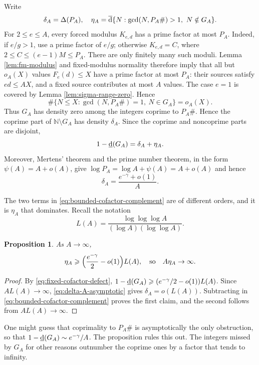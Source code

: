 \documentclass[11pt,letterpaper,reqno]{amsart}
\numberwithin{equation}{section}
\newtheorem{proposition}[theorem]{Proposition}
\theoremstyle{remark}
\newcommand{\N}{\mathbb{N}}
\newcommand{\1}{\mathbf 1}
\newcommand{\lowerdens}{\underline{\textup{d}}}
\newcommand{\upperdens}{\overline{\textup{d}}}
\renewcommand{\leq}{\leqslant}
\renewcommand{\geq}{\geqslant}
\begin{document}
Write
\[
 \delta_A=\Delta(P_A),\quad
 \eta_A=\upperdens\{N:\gcd(N,P_A\#)>1,\ N\notin G_A\}.
\]
For $2\leq e\leq A$, every forced modulus $K_{e,d}$ has a prime
factor at most $P_A$. Indeed, if $e/g>1$, use a prime factor of $e/g$;
otherwise $K_{e,d}=C$, where $2\leq C\leq(e-1)M\leq P_A$.
There are only finitely many such moduli. Lemma \ref{lem:fm-modulus}
and fixed-modulus normality therefore imply that all but $o_A(X)$
values $F_e(d)\leq X$ have a prime factor at most $P_A$: their sources
satisfy $ed\leq AX$, and a fixed source contributes at most $A$ values.
The case $e=1$ is covered by Lemma \ref{lem:sigma-range-zero}. Hence
\[
 \#\{N\leq X:\gcd(N,P_A\#)=1,\ N\in G_A\}=o_A(X).
\]
Thus $G_A$ has density zero among the integers coprime to
$P_A\#$. Hence the coprime part of $\N\setminus G_A$ has density
$\delta_A$. Since the coprime and noncoprime parts are disjoint,
\begin{equation}\label{eq:bounded-cofactor-complement}
 1-\lowerdens(G_A)=\delta_A+\eta_A.
\end{equation}
Moreover, Mertens' theorem and the prime number theorem, in the form
$\psi(A)=A+o(A)$, give
$\log P_A=\log A+\psi(A)=A+o(A)$ and hence
\begin{equation}\label{eq:delta-A-asymptotic}
 \delta_A=\frac{e^{-\gamma}+o(1)}A.
\end{equation}

The two terms in \eqref{eq:bounded-cofactor-complement} are of different
orders, and it is $\eta_A$ that dominates. Recall the notation
\[
 L(A)=\frac{\log\log\log A}{(\log A)(\log\log A)} .
\]

\begin{proposition}
As $A\to\infty$,
\[
 \eta_A\geq\Bigl(\frac{e^{-\gamma}}2-o(1)\Bigr)L(A),
 \quad\text{so}\quad A\eta_A\to\infty .
\]
\end{proposition}

\begin{proof}
By \eqref{eq:fixed-cofactor-defect},
$1-\lowerdens(G_A)\geq(e^{-\gamma}/2-o(1))L(A)$. Since $AL(A)\to\infty$,
\eqref{eq:delta-A-asymptotic} gives $\delta_A=o(L(A))$. Subtracting in
\eqref{eq:bounded-cofactor-complement} proves the first claim, and the
second follows from $AL(A)\to\infty$.
\end{proof}

One might guess that coprimality to $P_A\#$ is asymptotically
the only obstruction, so that $1-\lowerdens(G_A)\sim e^{-\gamma}/A$. The
proposition rules this out. The integers missed by $G_A$ for other reasons
outnumber the coprime ones by a factor that tends to infinity.
\end{document}
